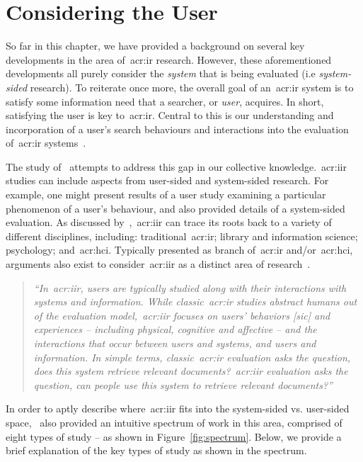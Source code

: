 \section{Considering the User}\label{sec:ir_background:user}
So far in this chapter, we have provided a background on several key developments in the area of~\gls{acr:ir} research. However, these aforementioned developments all purely consider the \emph{system} that is being evaluated (i.e \emph{system-sided} research). To reiterate once more, the overall goal of an~\gls{acr:ir} system is to satisfy some information need that a searcher, or \emph{user}, acquires. In short, satisfying the user is key to~\gls{acr:ir}. Central to this is our understanding and incorporation of a user's search behaviours and interactions into the evaluation of~\gls{acr:ir} systems~\citep{callan2007minds}.

The study of~ attempts to address this gap in our collective knowledge.~\gls{acr:iir} studies can include aspects from user-sided and system-sided research. For example, one might present results of a user study examining a particular phenomenon of a user's behaviour, and also provided details of a system-sided evaluation. As discussed by~\cite{kelly2009iir},~\gls{acr:iir} can trace its roots back to a variety of different disciplines, including: traditional~\gls{acr:ir}; library and information science; psychology; and~\gls{acr:hci}. Typically presented as branch of~\gls{acr:ir} and/or~\gls{acr:hci}, arguments also exist to consider~\gls{acr:iir} as a distinct area of research~\citep{ruthven2008iir}.

\begin{quote}
\emph{``In~\gls{acr:iir}, users are typically studied along with their interactions with systems and information. While classic~\gls{acr:ir} studies abstract humans out of the evaluation model,~\gls{acr:iir} focuses on users' behaviors [sic] and experiences -- including physical, cognitive and affective -- and the interactions that occur between users and systems, and users and information. In simple terms, classic~\gls{acr:ir} evaluation asks the question, does this system retrieve relevant documents?~\gls{acr:iir} evaluation asks the question, can people use this system to retrieve relevant documents?''}
\end{quote}

In order to aptly describe where~\gls{acr:iir} fits into the system-sided vs. user-sided space,~\cite{kelly2009iir} also provided an intuitive spectrum of work in this area, comprised of eight types of study -- as shown in Figure~\ref{fig:spectrum}. Below, we provide a brief explanation of the key types of study as shown in the spectrum.

